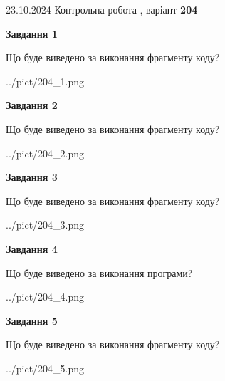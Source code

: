 \documentclass[12pt, ukrainian]{article}
\begin{document}
{\Large{23.10.2024 Контрольна робота , варіант  \No \textbf { 204 }\par}}
{
\begin {large}
{\begin {center}\textbf{Завдання 1}\end {center}}

Що буде виведено за виконання фрагменту коду?\par
\begin{center}
	{../pict/204_1.png}
\end{center}
\newpage

{\begin {center}\textbf{Завдання 2}\end {center}}

Що буде виведено за виконання фрагменту коду?\par
\begin{center}
	{../pict/204_2.png}
\end{center}
\newpage

{\begin {center}\textbf{Завдання 3}\end {center}}

Що буде виведено за виконання фрагменту коду?\par
\begin{center}
	{../pict/204_3.png}
\end{center}
\newpage

{\begin {center}\textbf{Завдання 4}\end {center}}

Що буде виведено за виконання програми?\par
\begin{center}
	{../pict/204_4.png}
\end{center}
\newpage

{\begin {center}\textbf{Завдання 5}\end {center}}

Що буде виведено за виконання фрагменту коду?\par
\begin{center}
	{../pict/204_5.png}
\end{center}
\newpage


\end{large}}
\end{document}
